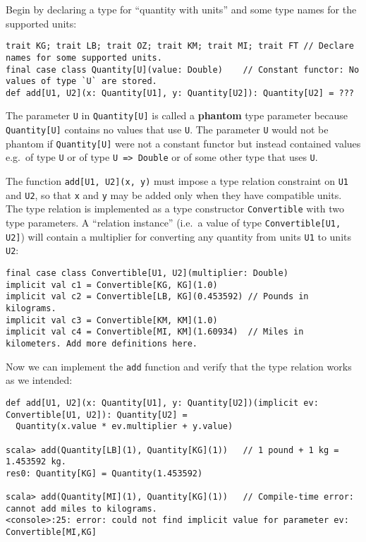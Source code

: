 Begin by declaring a type for ``quantity with units'' and some type
names for the supported units:
\begin{lstlisting}
trait KG; trait LB; trait OZ; trait KM; trait MI; trait FT // Declare names for some supported units.
final case class Quantity[U](value: Double)    // Constant functor: No values of type `U` are stored.
def add[U1, U2](x: Quantity[U1], y: Quantity[U2]): Quantity[U2] = ???
\end{lstlisting}
The parameter \lstinline!U! in \lstinline!Quantity[U]! is called
a \textbf{phantom} type parameter because
\lstinline!Quantity[U]! contains no values that use \lstinline!U!.
The parameter \lstinline!U! would not be phantom if \lstinline!Quantity[U]!
were not a constant functor
but instead contained values e.g.~of type \lstinline!U! or of type
\lstinline!U => Double! or of some other type that uses \lstinline!U!. 

The function \lstinline!add[U1, U2](x, y)! must impose a type relation
constraint on \lstinline!U1! and \lstinline!U2!, so that \lstinline!x!
and \lstinline!y! may be added only when they have compatible units.
The type relation is implemented as a type constructor \lstinline!Convertible!
with two type parameters. A ``relation instance'' (i.e.~a value
of type \lstinline!Convertible[U1, U2]!) will contain a multiplier
for converting any quantity from units \lstinline!U1! to units \lstinline!U2!:
\begin{lstlisting}
final case class Convertible[U1, U2](multiplier: Double)
implicit val c1 = Convertible[KG, KG](1.0)
implicit val c2 = Convertible[LB, KG](0.453592) // Pounds in kilograms.
implicit val c3 = Convertible[KM, KM](1.0)
implicit val c4 = Convertible[MI, KM](1.60934)  // Miles in kilometers. Add more definitions here.
\end{lstlisting}
Now we can implement the \lstinline!add! function and verify that
the type relation works as we intended:
\begin{lstlisting}
def add[U1, U2](x: Quantity[U1], y: Quantity[U2])(implicit ev: Convertible[U1, U2]): Quantity[U2] =
  Quantity(x.value * ev.multiplier + y.value)

scala> add(Quantity[LB](1), Quantity[KG](1))   // 1 pound + 1 kg = 1.453592 kg.
res0: Quantity[KG] = Quantity(1.453592)

scala> add(Quantity[MI](1), Quantity[KG](1))   // Compile-time error: cannot add miles to kilograms.
<console>:25: error: could not find implicit value for parameter ev: Convertible[MI,KG]
\end{lstlisting}

